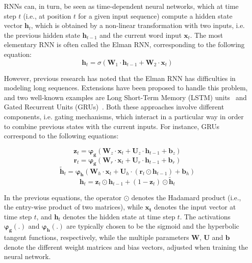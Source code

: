 RNNs can, in turn, be seen as time-dependent neural networks, which at time step $t$ (i.e., at position $t$ for a given input sequence) compute a hidden state vector $\boldsymbol{h}_t$, which is obtained by a non-linear transformation with two inputs, i.e. the previous hidden state $\boldsymbol{h}_{t-1}$ and the current word input $\boldsymbol{x}_t$. The most elementary RNN is often called the Elman RNN, corresponding to the following equation:
\begin{equation}
\boldsymbol{h}_t = \sigma \left( \boldsymbol{W}_1 \cdot \boldsymbol{h}_{t-1} + \boldsymbol{W}_2 \cdot \boldsymbol{x}_t \right)
\end{equation}

However, previous research has noted that the Elman RNN has difficulties in modeling long sequences. Extensions have been proposed to handle this problem, and two well-known examples are Long Short-Term Memory (LSTM) units~\citep{Hochreiter:1997:LSM:1246443.1246450} and Gated Recurrent Units (GRUs)~\cite{chung2014empirical}. Both these approaches involve different components, i.e. gating mechanisms, which interact in a particular way in order to combine previous states with the current inputs. For instance, GRUs correspond to the following equations:

\begin{equation}
\mathbf{\mathbf{z}}_{t} = \mathbf{\varphi_{g}} \left(\mathbf{W}_z \cdot \mathbf{x}_{t} + \mathbf{U}_z \cdot \mathbf{h}_{t-1} + \mathbf{b}_{z} \right)
\end{equation}
\begin{equation}
\mathbf{r}_{t}  = \mathbf{\varphi_{g}} \left( \mathbf{W}_{r} \cdot \mathbf{x}_{t} + \mathbf{U}_{r} \cdot \mathbf{h}_{t-1} + \mathbf{b}_{r} \right)
\end{equation}
\begin{equation}
\mathbf{\tilde{h}}_{t} = \mathbf{\varphi_{h}} \left( \mathbf{W}_{h} \cdot \mathbf{x}_{t} + \mathbf{U}_{h} \cdot ( \mathbf{r}_{t} \odot \mathbf{h}_{t-1})+ \mathbf{b}_{h} \right)
\end{equation}
\begin{equation}
\mathbf{h}_{t} = \mathbf{\mathbf{z}}_{t} \odot \mathbf{h}_{t-1} + (1- \mathbf{\mathbf{z}}_{t}) \odot \mathbf{\tilde{h}}_{t}
\label{eq:gru}
\end{equation}

In the previous equations, the operator $\odot$ denotes the Hadamard product (i.e., the entry-wise product of two matrices), while $\mathbf{x_{t}}$ denotes the input vector at time step $t$, and $\mathbf{h}_{t}$ denotes the hidden state at time step $t$. The activations $\mathbf{\varphi_{g}}(.)$ and $\mathbf{\varphi_{h}}(.)$ are typically chosen to be the sigmoid and the hyperbolic tangent functions, respectively, while the multiple parameters $\mathbf{W}$, $\mathbf{U}$ and $\mathbf{b}$ denote the different weight matrices and bias vectors, adjusted when training the neural network. 

